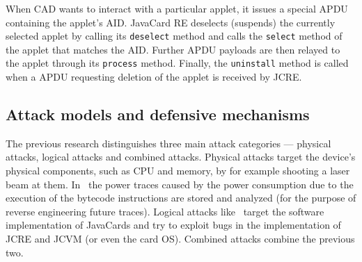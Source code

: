 \documentclass{../llncs/llncs}
\begin{document}
When CAD wants to interact with a particular applet, it issues a special APDU containing the applet's AID. JavaCard RE deselects (suspends) the currently selected applet by calling its \texttt{deselect} method and calls the \texttt{select} method of the applet that matches the AID. Further APDU payloads are then relayed to the applet through its \texttt{process} method. Finally, the \texttt{uninstall} method is called when a APDU requesting deletion of the applet is received by JCRE.


    \subsection{Attack models and defensive mechanisms}
    The previous research distinguishes three main attack categories --- physical attacks, logical attacks and combined attacks. Physical attacks target the device's physical components, such as CPU and memory, by for example shooting a laser beam at them. In~\cite{Prpic2010thesis} the power traces caused by the power consumption due to the execution of the bytecode instructions are stored and analyzed (for the purpose of reverse engineering future traces).
    Logical attacks like~\cite{hogenboom} target the software implementation of JavaCards and try to exploit bugs in the implementation of JCRE and JCVM (or even the card OS). Combined attacks combine the previous two.

\end{document}
